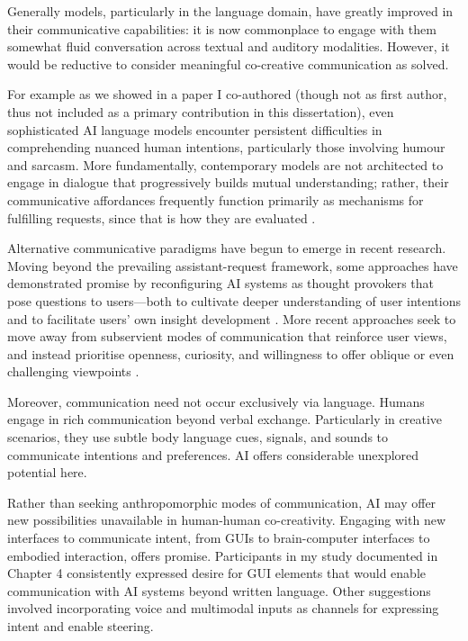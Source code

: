 Generally models, particularly in the language domain, have greatly improved in their communicative capabilities: it is now commonplace to engage with them somewhat fluid conversation across textual and auditory modalities. However, it would be reductive to consider meaningful co-creative communication as solved. 

For example as we showed in a paper I co-authored (though not as first author, thus not included as a primary contribution in this dissertation), even sophisticated AI language models encounter persistent difficulties in comprehending nuanced human intentions, particularly those involving humour and sarcasm. More fundamentally, contemporary models are not architected to engage in dialogue that progressively builds mutual understanding; rather, their communicative affordances frequently function primarily as mechanisms for fulfilling requests, since that is how they are evaluated \cite{Ouyang2022-af}.

Alternative communicative paradigms have begun to emerge in recent research. Moving beyond the prevailing assistant-request framework, some approaches have demonstrated promise by reconfiguring AI systems as thought provokers that pose questions to users—both to cultivate deeper understanding of user intentions and to facilitate users' own insight development \cite{Kim2023-wt}. More recent approaches seek to move away from subservient modes of communication that reinforce user views, and instead prioritise openness, curiosity, and willingness to offer oblique or even challenging viewpoints \cite{Anthropic2024-ne}.

Moreover, communication need not occur exclusively via language. Humans engage in rich communication beyond verbal exchange. Particularly in creative scenarios, they use subtle body language cues, signals, and sounds to communicate intentions and preferences. AI offers considerable unexplored potential here.

Rather than seeking anthropomorphic modes of communication, AI may offer new possibilities unavailable in human-human co-creativity. Engaging with new interfaces to communicate intent, from GUIs to brain-computer interfaces to embodied interaction, offers promise. Participants in my study documented in Chapter 4 consistently expressed desire for GUI elements that would enable communication with AI systems beyond written language. Other suggestions involved incorporating voice and multimodal inputs as channels for expressing intent and enable steering. 


